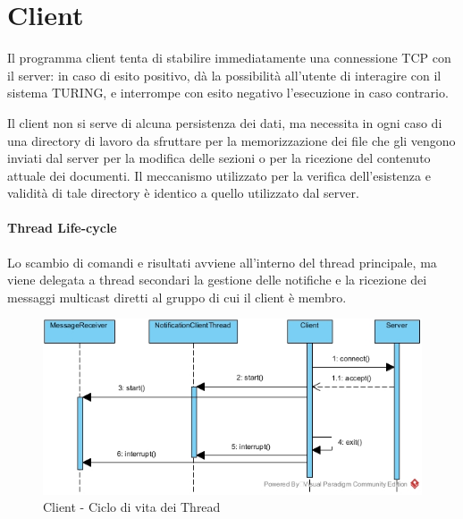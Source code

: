 \section{Client}
Il programma client tenta di stabilire immediatamente una connessione TCP con il server: in caso di esito positivo, dà la possibilità all'utente di interagire con il sistema TURING, e interrompe con esito negativo l'esecuzione in caso contrario.

Il client non si serve di alcuna persistenza dei dati, ma necessita in ogni caso di una directory di lavoro da sfruttare per la memorizzazione dei file che gli vengono inviati dal server per la modifica delle sezioni o per la ricezione del contenuto attuale dei documenti. Il meccanismo utilizzato per la verifica dell'esistenza e validità di tale directory è identico a quello utilizzato dal server.

\paragraph{Thread Life-cycle}
Lo scambio di comandi e risultati avviene all'interno del thread principale, ma viene delegata a thread secondari la gestione delle notifiche e la ricezione dei messaggi multicast diretti al gruppo di cui il client è membro.

\begin{figure}[h]
	\caption{Client - Ciclo di vita dei Thread}
	\centering
	\includegraphics[scale=0.5]{assets/client/thread_activation_sequence_diagram}
\end{figure}